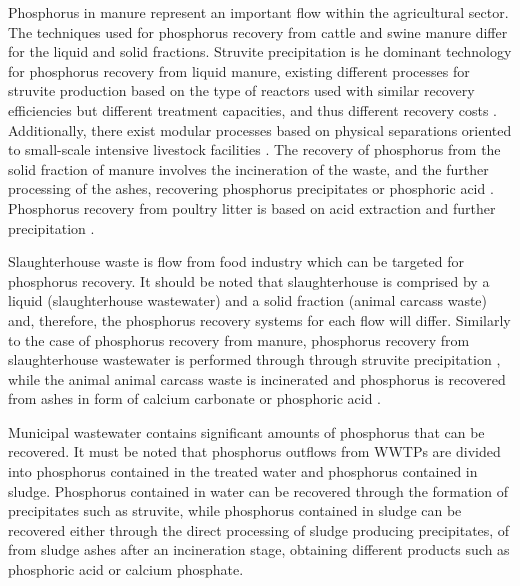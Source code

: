 \documentclass[authoryear]{elsarticle}
\begin{document}
Phosphorus in manure represent an important flow within the agricultural sector.
The techniques used for phosphorus recovery from cattle and swine manure differ for the liquid and solid fractions. Struvite precipitation is he dominant technology for phosphorus recovery from liquid manure, existing different processes for struvite production based on the type of reactors used with similar recovery efficiencies but different treatment capacities, and thus different recovery costs \citep{martin2021geospatial}. Additionally, there exist modular processes based on physical separations oriented to small-scale intensive livestock facilities \citep{church_versatility_2018}. The recovery of phosphorus from the solid fraction of manure involves the incineration of the waste, and the further processing of the ashes, recovering phosphorus precipitates or phosphoric acid \citep{jupp2021phosphorus,egle_phosphorus_2016}. Phosphorus recovery from poultry litter is based on acid extraction and further precipitation \citep{szogi2008phosphorus}.

Slaughterhouse waste is flow from food industry which can be targeted for phosphorus recovery. It should be noted that slaughterhouse is comprised by a liquid (slaughterhouse wastewater) and a solid fraction (animal carcass waste) and, therefore, the phosphorus recovery systems for each flow will differ. Similarly to the case of phosphorus recovery from manure, phosphorus recovery from slaughterhouse wastewater is performed through through struvite precipitation \citep{Pearl2Kcost2}, while the animal animal carcass waste is incinerated and phosphorus is recovered from ashes in form of calcium carbonate or phosphoric acid \citep{jupp2021phosphorus}.

Municipal wastewater contains significant amounts of phosphorus that can be recovered. It must be noted that phosphorus outflows from WWTPs are divided into phosphorus contained in the treated water and phosphorus contained in sludge. Phosphorus contained in water can be recovered through the formation of precipitates such as struvite, while phosphorus contained in sludge can be recovered either through the direct processing of sludge producing precipitates, of from sludge ashes after an incineration stage, obtaining different products such as phosphoric acid or calcium phosphate.
\end{document}
